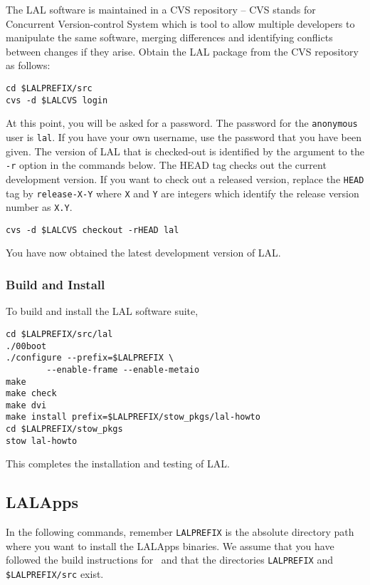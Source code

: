 The LAL software is maintained in a CVS repository -- CVS stands for
Concurrent Version-control System which is tool to allow multiple developers
to manipulate the same software,  merging differences and identifying
conflicts between changes if they arise.  Obtain the LAL package from the CVS
repository as follows:  
\begin{verbatim}
cd $LALPREFIX/src
cvs -d $LALCVS login
\end{verbatim}
At this point,  you will be asked for a password.  The password for the
\verb+anonymous+ user is \verb+lal+. If you have your own username, use the
password that you have been given.
The version of LAL that is checked-out is identified by the argument
to the \texttt{-r} option in the commands below.   The HEAD tag checks out the
current development version.  If you want to check out a released
version, replace the \verb+HEAD+ tag by \verb+release-X-Y+ where
\verb+X+ and \verb+Y+ are integers which identify the release version
number as \verb+X.Y+.
\begin{verbatim}
cvs -d $LALCVS checkout -rHEAD lal
\end{verbatim}
You have now obtained the latest development version of LAL.

\subsubsection{Build and Install}
To build and install the LAL software suite, 
\begin{verbatim}
cd $LALPREFIX/src/lal
./00boot
./configure --prefix=$LALPREFIX \
        --enable-frame --enable-metaio
make
make check
make dvi
make install prefix=$LALPREFIX/stow_pkgs/lal-howto
cd $LALPREFIX/stow_pkgs
stow lal-howto
\end{verbatim}
This completes the installation and testing of LAL.  

\color{black}
\subsection{LALApps}
\color{black}

In the following commands, remember \verb+LALPREFIX+ is the absolute
directory path where you want to install the LALApps binaries.  We
assume that you have followed the build instructions for \lal\ and
that the directories \verb+LALPREFIX+ and \verb+$LALPREFIX/src+ exist.

